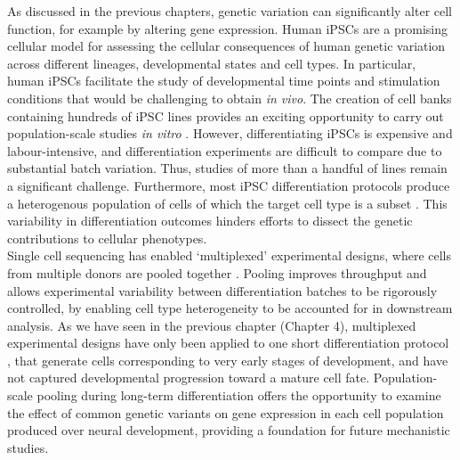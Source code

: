 As discussed in the previous chapters, genetic variation can significantly alter cell function, for example by altering gene expression. 
Human iPSCs are a promising cellular model for assessing the cellular consequences of human genetic variation across different lineages, developmental states and cell types. 
In particular, human iPSCs facilitate the study of developmental time points and stimulation conditions that would be challenging to obtain \textit{in vivo}. 
The creation of cell banks containing hundreds of iPSC lines \cite{kilpinen2017common} provides an exciting opportunity to carry out population-scale studies \textit{in vitro} \cite{cuomo2020single, strober2019dynamic, schwartzentruber2018molecular, alasoo2018shared}.
However, differentiating iPSCs is expensive and labour-intensive, and differentiation experiments are difficult to compare due to substantial batch variation. 
Thus, studies of more than a handful of lines remain a significant challenge.
Furthermore, most iPSC differentiation protocols produce a heterogenous population of cells of which the target cell type is a subset \cite{d2019vitro, banovich2018impact, volpato2018reproducibility, nguyen2018single}. 
This variability in differentiation outcomes hinders efforts to dissect the genetic contributions to cellular phenotypes.\\

Single cell sequencing has enabled `multiplexed' experimental designs, where cells from multiple donors are pooled together \cite{cuomo2020single, nguyen2018single}. 
Pooling improves throughput and allows experimental variability between differentiation batches to be rigorously controlled, by enabling cell type heterogeneity to be accounted for in downstream analysis. 
As we have seen in the previous chapter (Chapter 4), multiplexed experimental designs have only been applied to one short differentiation protocol \cite{cuomo2020single}, that generate cells corresponding to very early stages of development, and have not captured developmental progression toward a mature cell fate. 
Population-scale pooling during long-term differentiation offers the opportunity to examine the effect of common genetic variants on gene expression in each cell population produced over neural development, providing a foundation for future mechanistic studies.\\

